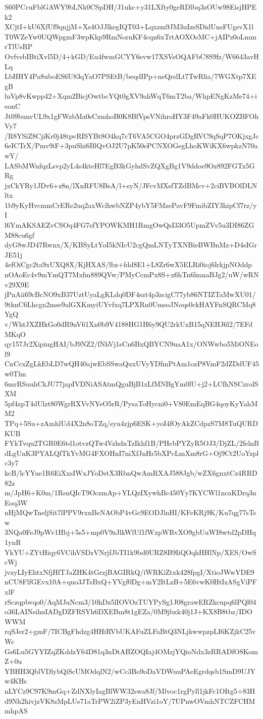 S60PCcuFblGAWY9bLNk0CSpDH/J1ukc+y31LXfty0geRDlbq3zOUw98EisjHPEk2
XCjtI+kU6XfUf9qnjjM+Xs4OJJlkegIQT03+Lqxzm9JM3uIzsSDidUnsFUgsvX1l
T0WZeYw0UQWpgmF3wpKkp9RmNornKF4cqn6xTrtAOXOsMC+jAIPz0oLmmrTlUsRP
OvfvsbIBtiXvl5D/4+kGD/Eu4fwmGCYY6evw17XSVsOQAFbC8S9fz/W6643avHLq
LbHHY4Pa8uboES6U83qYaO7PSEtB/beqdIPp+neQrslLt7TwRlia/7WGXtp7XEgB
luVp8vKwpp42+Xqm2BicjOwtbcYQt0gXV9ahWqT6mT2ba/WhpENgKzMe74+ieonC
Jt09bunvUL9x1gFWzbMa0sCzmhoB0K8BfVpsVNihroHY3F49aFk0HUKOZBFOhVy7
/R8YSiZ8CjiKr0j48tpvRISYBt8O4kq7cT6VA5CGO4przGDgRVC9qSqP7OKjxgJc
6eICTrX/Pmv9iF+3puShi6BlQvOJ2U7pK50ePCNXOGegLhoKWiKX6wpkzN70awY/
LASbMWnfqzLsvp2yL4s4kteHl7EgB3kGyhdSvZQXgBg1V9ddoe9Oz892FGTx5GRg
jxCkYRy1JDv6+z8n/lXnRFU8BsA/l+syN/JFcvMXsfTZdBMcv+2ciBVBOlDLNltx
1b9yKyHvcmmCrERe2uq2axWclhwbNZP4ybY5FMzePavF9FmibZIY3hipCf7rz/yI
l6YmAKSAEZvCSOq4FG7efYPOWKMH1RmgOwQsI33O5UpmZVv5u3DI86ZGM88cu6gf
dyG8wJD47Rwnx/X/KBSyLtYoI5kNIcU2cgQmLNTyTXNBieBWBnMz+D4sIGrJE51j
4efOiCgc2ta9xUXQ8X/KjHXAS/lbz+fdd8E1+L8Zr6wX5ELRi0ioj6lrkjpNOddp
nOAoEc4v9mYmQT7Mxfm889QVw/PMyCcmPx8S+x6hTn6lmnaBJg2/uW/wRNv29X9E
jPnAii69cBcNO9xB37UztUyaLgKLdq0DF4szt4p3zcigC77yb86NTIZTaMwXU01/
9tknC6Lhcgn2mse9alGXKmyiUYvfxq7LPXRn0UmsoJNoqs0ckHAYFnSQRCMq8YgQ
v/WhtJXZHkGo0dR9nV61Xn0b9V4188HG1H6y9QU2rkUxB15qNEHJ6l2/7EFdMKqO
qy157Jr2XipiugHAI/bJ9NZ2/fNhVj1sCn6BxQBYCN9uaA1x/ONWwbo5MiONEol9
CnCcxZgLkEbLD7wQH40ajwEbSSwaQuxUVyYDfmPtAm1ozP8VmF2dZDdUF45w0Tlm
6mrRSuuhCkJU77japIVDNiASAtmQguBjB1zLfMNBgYm0lU+j2+LCfhNSCzrolSXM
5pf4zpT4dUlzt80WgrRXVvNYeO5rR/PysaToHycni0+V80EmEqBG4qoyKyYahMM2
TPq+5Su+zAmhlUd4X2n8oTZq/syu4zjp6ESK+yoI4fOyAkZCdpzS7M8TuQURDKUB
FYkTvqu2TGR0E6td1otvzQTw4VzhdnTzIkhf1B/PHcbPYZyR5OJ3/DjZL/2felnB
dLgUnK3PYALQfTkYvMG4FXOHnI7niXfJnHr5bXPcLmXm8rG+Oj9Ct2UoYzplc3y7
kcB/lcYYue1R6EiXxsIWxJYoDstX3RbnQwAmRXAJ588Jgb/wZX6gnxtCz4RRD82z
m/JpH6+K0m/1RsnQIcT9OczmAp+YLQzIXywhBc450Yy7KYCWl1ncaKDrq3nEoq3W
nHjMQwTneljSit7lPPV9rxnBeNAObP4vGc9EODJlnHI/KFeKRj9K/Ku7qg77sTsw
3NQa0FeJ9pWv1Hbj+5s5+mp0V9zJlkWlUf1fWxpWRvXO9gbUuWI8wtd2pDHq1ynR
YkYU+ZYtHiqy6VCihVSDzVNrjfJbTI1k9bd0URZ8B9IiQOqhHHlNp/XES/OwScWj
jvzyLIyEhtxNfjHfTJaZHK4tGrzjBAGIRkQ/iWRKiZtxk428fpgI/XtioJWwYDE9
nCU8FlfGEvx10A+quo3JTsBxQ+YVgf0Dg+mY2ItLzB+5E6vwK0HtIzASgViPFxlF
rSczqpbvqo0/AqMJuNcm3/10hDz5lIOVOzTUYPySg1J08grawERZkcupq6lPQl04
o36LAINsihuIADgDZFRSYh6DXEBm8t1gEZa/0M9jbxk40j1J+KX8B8tbz/IDOWWM
rqSJer2+gmF/7ICBgFhdzg4HHiRVbUKAFuZLFaBtQ3NLjkwwpzpLI6KZjkC25vWc
Gs6Lu5GYYIZqZKddzY64D81q3nDtABZOQIaj4OMzjYQioNdx3zRRADfO8KomZ+0u
YBHH3QblVDlybQiScUMOdqlN2/wCc3Bo9oDaVDWuuPAeEgrdqsb1SmD9UJYw4KHs
nLYCz9C97K9mGq+ZdNXlyIagBlWW32swa8Jf/Mlvoc1rgPyll1jkFc1OItg5+83H
d9Nh2hivjzVK8zMpLUs71aTrPW2iZP3yEnHVzi1oY/7UPnwOVmhNTCZFCHMmhpAS
